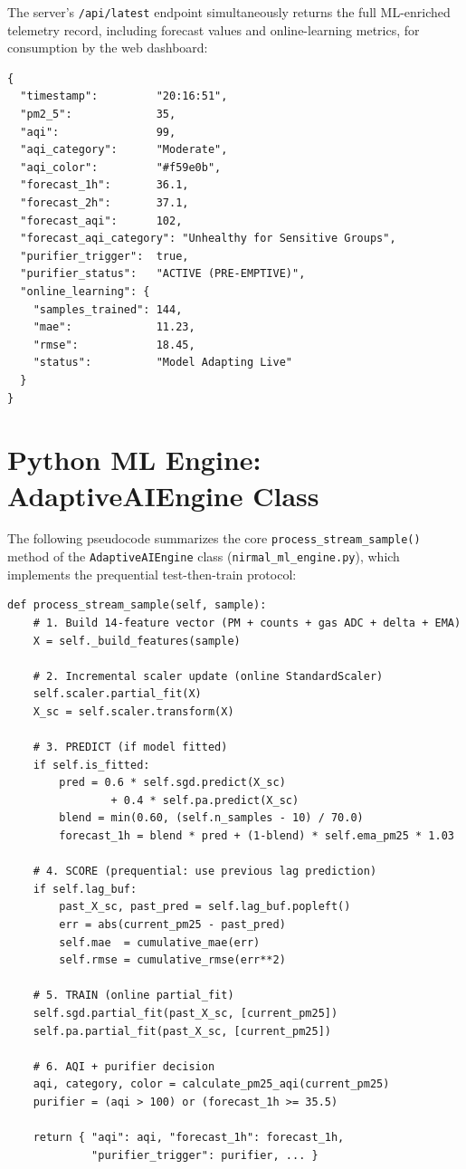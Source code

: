 \noindent The server's \texttt{/api/latest} endpoint simultaneously returns the full ML-enriched telemetry record, including forecast values and online-learning metrics, for consumption by the web dashboard:

\begin{small}
\begin{verbatim}
{
  "timestamp":         "20:16:51",
  "pm2_5":             35,
  "aqi":               99,
  "aqi_category":      "Moderate",
  "aqi_color":         "#f59e0b",
  "forecast_1h":       36.1,
  "forecast_2h":       37.1,
  "forecast_aqi":      102,
  "forecast_aqi_category": "Unhealthy for Sensitive Groups",
  "purifier_trigger":  true,
  "purifier_status":   "ACTIVE (PRE-EMPTIVE)",
  "online_learning": {
    "samples_trained": 144,
    "mae":             11.23,
    "rmse":            18.45,
    "status":          "Model Adapting Live"
  }
}
\end{verbatim}
\end{small}

\chapter{Python ML Engine: AdaptiveAIEngine Class}
\label{app:ml-engine}

The following pseudocode summarizes the core \texttt{process\_stream\_sample()} method of the \texttt{AdaptiveAIEngine} class (\texttt{nirmal\_ml\_engine.py}), which implements the prequential test-then-train protocol:

\begin{small}
\begin{verbatim}
def process_stream_sample(self, sample):
    # 1. Build 14-feature vector (PM + counts + gas ADC + delta + EMA)
    X = self._build_features(sample)

    # 2. Incremental scaler update (online StandardScaler)
    self.scaler.partial_fit(X)
    X_sc = self.scaler.transform(X)

    # 3. PREDICT (if model fitted)
    if self.is_fitted:
        pred = 0.6 * self.sgd.predict(X_sc)
                + 0.4 * self.pa.predict(X_sc)
        blend = min(0.60, (self.n_samples - 10) / 70.0)
        forecast_1h = blend * pred + (1-blend) * self.ema_pm25 * 1.03

    # 4. SCORE (prequential: use previous lag prediction)
    if self.lag_buf:
        past_X_sc, past_pred = self.lag_buf.popleft()
        err = abs(current_pm25 - past_pred)
        self.mae  = cumulative_mae(err)
        self.rmse = cumulative_rmse(err**2)

    # 5. TRAIN (online partial_fit)
    self.sgd.partial_fit(past_X_sc, [current_pm25])
    self.pa.partial_fit(past_X_sc, [current_pm25])

    # 6. AQI + purifier decision
    aqi, category, color = calculate_pm25_aqi(current_pm25)
    purifier = (aqi > 100) or (forecast_1h >= 35.5)

    return { "aqi": aqi, "forecast_1h": forecast_1h,
             "purifier_trigger": purifier, ... }
\end{verbatim}
\end{small}
